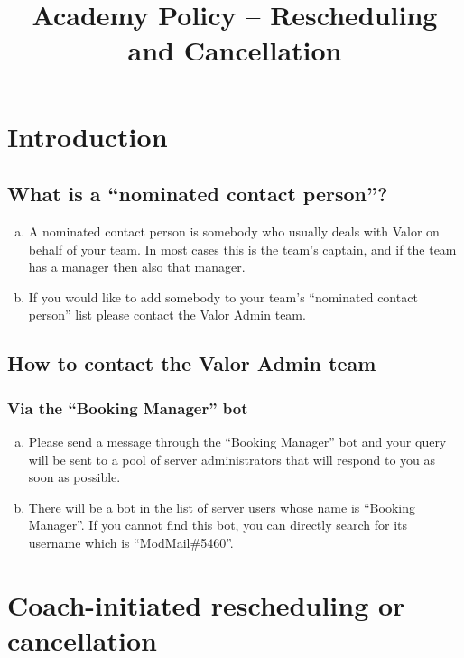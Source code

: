 \documentclass[10pt]{article}
\begin{document}
\title{Academy Policy -- Rescheduling and Cancellation}


\section{Introduction}

\subsection{What is a ``nominated contact person''?}
\begin{enumerate}[(a)]
\item
A nominated contact person is somebody who usually deals with Valor on behalf of your team. In most cases this is the team's captain, and if the team has a manager then also that manager.

\item
If you would like to add somebody to your team's ``nominated contact person'' list please contact the Valor Admin team.
\end{enumerate}

\subsection{How to contact the Valor Admin team}
\subsubsection{Via the ``Booking Manager'' bot}
\begin{enumerate}[(a)]
\item
Please send a message through the ``Booking Manager'' bot and your query will be sent to a pool of server administrators that will respond to you as soon as possible.

\item
There will be a bot in the list of server users whose name is ``Booking Manager''. If you cannot find this bot, you can directly search for its username which is
``ModMail\#5460''.
\end{enumerate}


\section{Coach-initiated rescheduling or cancellation}
\end{document}
